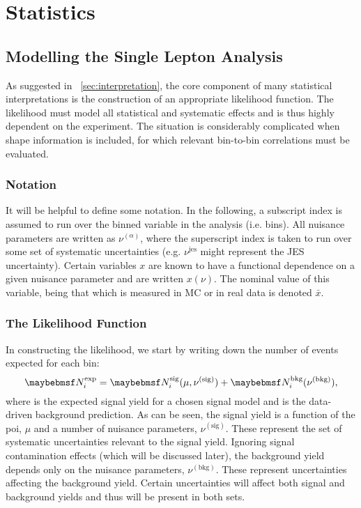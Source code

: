 \chapter{Statistics}
\section{Modelling the Single Lepton Analysis}
\label{sec:inter_1lepton}
As suggested in \chap~\ref{sec:interpretation}, the core component of many
statistical interpretations is the construction of an appropriate likelihood
function. The likelihood must model all statistical and systematic effects and
is thus highly dependent on the experiment. The situation is considerably
complicated when shape information is included, for which relevant bin-to-bin
correlations must be evaluated.

\subsection{Notation}
It will be helpful to define some notation. In the following, a subscript index
is assumed to run over the binned variable in the analysis (i.e. \STlep
bins). All nuisance parameters are written as $\nu^{(\alpha)}$, where the
superscript index is taken to run over some set of systematic uncertainties
(e.g. $\nu^{\textrm{jes}}$ might represent the \ac{JES} uncertainty). Certain
variables $x$ are known to have a functional dependence on a given nuisance
parameter and are written $x(\nu)$. The nominal value of this variable, being
that which is measured in \ac{MC} or in real data is denoted $\bar{x}$.

\subsection{The Likelihood Function}
In constructing the likelihood, we start by writing down the number of events
expected for each bin:
\begin{equation*}
\NExpi = \NSigi(\mu, \nu^{(\textrm{sig})}) +
\NBkgi(\nu^{(\textrm{bkg})}),
\end{equation*}
where \NSigi is the expected signal yield for a chosen signal model and \NBkgi
is the data-driven background prediction. As can be seen, the signal yield is a
function of the \ac{poi}, $\mu$ and a number of nuisance parameters,
$\nu^{(\textrm{sig})}$. These represent the set of systematic uncertainties
relevant to the signal yield. Ignoring signal contamination effects (which will
be discussed later), the background yield depends only on the nuisance
parameters, $\nu^{(\textrm{bkg})}$. These represent uncertainties affecting the
background yield. Certain uncertainties will affect both signal and background
yields and thus will be present in both sets.


